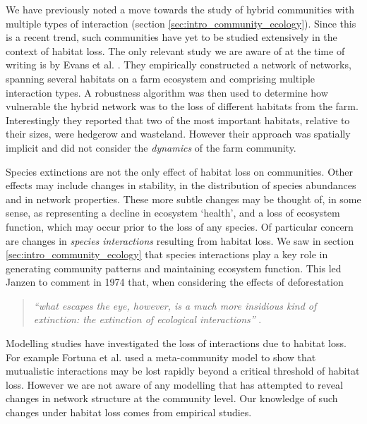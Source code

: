 We have previously noted a move towards the study of hybrid communities with multiple types of interaction (section \ref{sec:intro_community_ecology}). Since this is a recent trend, such communities have yet to be studied extensively in the context of habitat loss. The only relevant study we are aware of at the time of writing is by Evans et al. \cite{evans2013robustness}. They empirically constructed a network of networks, spanning several habitats on a farm ecosystem and comprising multiple interaction types. A robustness algorithm was then used to determine how vulnerable the hybrid network was to the loss of different habitats from the farm. Interestingly they reported that two of the most important habitats, relative to their sizes, were hedgerow and wasteland. However their approach was spatially implicit and did not consider the \emph{dynamics} of the farm community. 

Species extinctions are not the only effect of habitat loss on communities. Other effects may include changes in stability, in the distribution of species abundances and in network properties. These more subtle changes may be thought of, in some sense, as representing a decline in ecosystem `health', and a loss of ecosystem function, which may occur prior to the loss of any species. Of particular concern are changes in \emph{species interactions} resulting from habitat loss. We saw in section \ref{sec:intro_community_ecology} that species interactions play a key role in generating community patterns and maintaining ecosystem function. This led Janzen to comment in 1974 that, when considering the effects of deforestation

\begin{quote}
 \emph{``what escapes the eye, however, is a much more insidious kind of extinction: the extinction of ecological interactions''} \cite{janzen1974}.
\end{quote}
%
Modelling studies have investigated the loss of interactions due to habitat loss. For example Fortuna et al. \cite{fortuna2013habitat} used a meta-community model to show that mutualistic interactions may be lost rapidly beyond a critical threshold of habitat loss. However we are not aware of any modelling that has attempted to reveal changes in network structure at the community level. Our knowledge of such changes under habitat loss comes from empirical studies.


